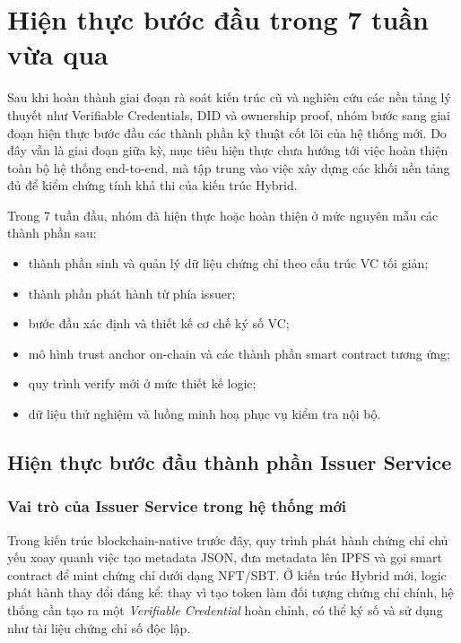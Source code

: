 \chapter{Hiện thực bước đầu trong 7 tuần vừa qua}

Sau khi hoàn thành giai đoạn rà soát kiến trúc cũ và nghiên cứu các nền tảng lý thuyết như Verifiable Credentials, DID và ownership proof, nhóm bước sang giai đoạn hiện thực bước đầu các thành phần kỹ thuật cốt lõi của hệ thống mới. Do đây vẫn là giai đoạn giữa kỳ, mục tiêu hiện thực chưa hướng tới việc hoàn thiện toàn bộ hệ thống end-to-end, mà tập trung vào việc xây dựng các khối nền tảng đủ để kiểm chứng tính khả thi của kiến trúc Hybrid.

Trong 7 tuần đầu, nhóm đã hiện thực hoặc hoàn thiện ở mức nguyên mẫu các thành phần sau:
\begin{itemize}
    \item thành phần sinh và quản lý dữ liệu chứng chỉ theo cấu trúc VC tối giản;
    \item thành phần phát hành từ phía issuer;
    \item bước đầu xác định và thiết kế cơ chế ký số VC;
    \item mô hình trust anchor on-chain và các thành phần smart contract tương ứng;
    \item quy trình verify mới ở mức thiết kế logic;
    \item dữ liệu thử nghiệm và luồng minh hoạ phục vụ kiểm tra nội bộ.
\end{itemize}

\section{Hiện thực bước đầu thành phần Issuer Service}

\subsection{Vai trò của Issuer Service trong hệ thống mới}

Trong kiến trúc blockchain-native trước đây, quy trình phát hành chứng chỉ chủ yếu xoay quanh việc tạo metadata JSON, đưa metadata lên IPFS và gọi smart contract để mint chứng chỉ dưới dạng NFT/SBT. Ở kiến trúc Hybrid mới, logic phát hành thay đổi đáng kể: thay vì tạo token làm đối tượng chứng chỉ chính, hệ thống cần tạo ra một \textit{Verifiable Credential} hoàn chỉnh, có thể ký số và sử dụng như tài liệu chứng chỉ số độc lập.

